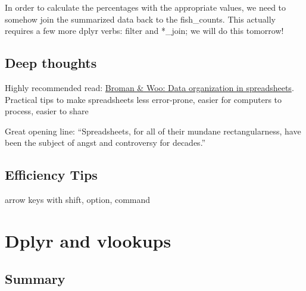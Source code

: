 \documentclass[]{book}
\newenvironment{Shaded}{\begin{snugshade}}{\end{snugshade}}
\newcommand{\CommentTok}[1]{\textcolor[rgb]{0.56,0.35,0.01}{\textit{#1}}}
\newcommand{\DataTypeTok}[1]{\textcolor[rgb]{0.13,0.29,0.53}{#1}}
\newcommand{\DecValTok}[1]{\textcolor[rgb]{0.00,0.00,0.81}{#1}}
\newcommand{\KeywordTok}[1]{\textcolor[rgb]{0.13,0.29,0.53}{\textbf{#1}}}
\newcommand{\NormalTok}[1]{#1}
\newcommand{\OperatorTok}[1]{\textcolor[rgb]{0.81,0.36,0.00}{\textbf{#1}}}
\newcommand{\StringTok}[1]{\textcolor[rgb]{0.31,0.60,0.02}{#1}}
\begin{document}
\begin{Shaded}
\end{Shaded}

In order to calculate the percentages with the appropriate values, we need to somehow join the summarized data back to the fish\_counts. This actually requires a few more dplyr verbs: filter and *\_join; we will do this tomorrow!

\hypertarget{deep-thoughts}{%
\section{Deep thoughts}\label{deep-thoughts}}

Highly recommended read: \href{https://peerj.com/preprints/3183/}{Broman \& Woo: Data organization in spreadsheets}. Practical tips to make spreadsheets less error-prone, easier for computers to process, easier to share

Great opening line: ``Spreadsheets, for all of their mundane rectangularness, have been the subject of angst and controversy for decades.''

\hypertarget{efficiency-tips-3}{%
\section{Efficiency Tips}\label{efficiency-tips-3}}

arrow keys with shift, option, command

\hypertarget{vlookup}{%
\chapter{Dplyr and vlookups}\label{vlookup}}

\hypertarget{summary-1}{%
\section{Summary}\label{summary-1}}
\end{document}
